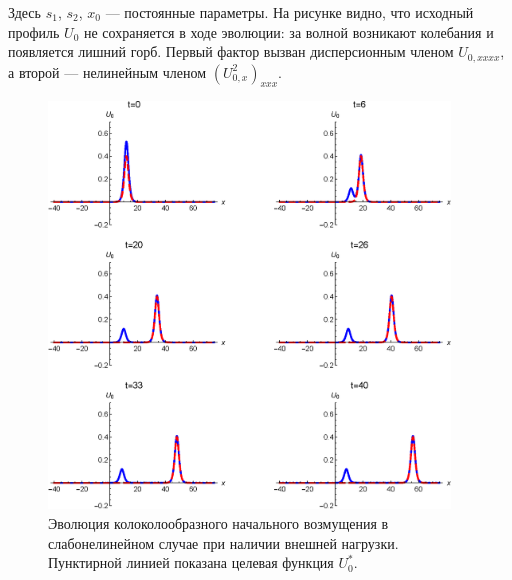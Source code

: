 Здесь $s_1$, $s_2$, $x_0$ --- постоянные параметры. На рисунке видно, что исходный профиль $U_0$ не сохраняется в ходе эволюции: за волной возникают колебания и появляется лишний горб. Первый фактор вызван дисперсионным членом $U_{0, xxxx}$, а второй --- нелинейным членом $(U_{0, x}^2)_{xxx}$.
\begin{figure}[h]
	\begin{center}
		\includegraphics[width=0.95\textwidth]{images/boundary_fig3.eps}
		\caption{Эволюция колоколообразного начального возмущения в слабонелинейном случае при наличии внешней нагрузки. Пунктирной линией показана целевая функция $U_0^*$.}
		\label{bound_figure3}
	\end{center}
\end{figure}

